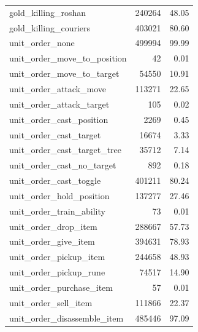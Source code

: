 \documentclass[a4paper,12pt,openany,oneside]{book}
\begin{document}
\begin{table}[H]
\begin{tabularx}{0.37\textwidth}{lrr}
		gold\_killing\_roshan                 &   240264        &   48.05                \\
		gold\_killing\_couriers               &   403021        &   80.60                \\
		unit\_order\_none                     &   499994        &   99.99                \\
		unit\_order\_move\_to\_position         &   42            &   0.01                 \\
		unit\_order\_move\_to\_target           &   54550         &   10.91                  \\
		unit\_order\_attack\_move              &   113271        &   22.65                \\
		unit\_order\_attack\_target            &   105           &   0.02                  \\
		unit\_order\_cast\_position            &   2269          &   0.45    \\
		unit\_order\_cast\_target              &   16674         &   3.33     \\
		unit\_order\_cast\_target\_tree         &   35712         &   7.14                 \\
		unit\_order\_cast\_no\_target           &   892           &   0.18                 \\
		unit\_order\_cast\_toggle              &   401211        &   80.24                \\
		unit\_order\_hold\_position            &   137277        &   27.46                \\
		unit\_order\_train\_ability            &   73            &   0.01                 \\
		unit\_order\_drop\_item                &   288667        &   57.73                \\
		unit\_order\_give\_item                &   394631        &   78.93      \\
		unit\_order\_pickup\_item              &   244658        &   48.93     \\
		unit\_order\_pickup\_rune              &   74517         &   14.90                \\
		unit\_order\_purchase\_item            &   57            &   0.01                 \\
		unit\_order\_sell\_item                &   111866        &   22.37     \\
		unit\_order\_disassemble\_item         &   485446        &   97.09      \\

\end{tabularx}
\end{table}
\end{document}
